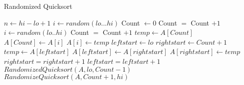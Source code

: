 \documentclass[11pt]{article}%
\begin{document}
    \begin{algorithm}
        \caption{Randomized Quicksort}
        \begin{algorithmic} 
        \newline
        \STATE $n \leftarrow hi - lo + 1$
        \STATE $i \leftarrow random (lo ... hi)$
        \STATE Count $\leftarrow 0$
        \STATE Count $=$ Count $+ 1$
        \ENDIF
        \ENDFOR
        \STATE $i \leftarrow random (lo .. hi) $
        \STATE Count $=$ Count $+ 1$
        \ENDIF
        \ENDFOR
        \ENDWHILE
        \STATE $temp \leftarrow A[Count]$
        \STATE $A[Count] \leftarrow A[i]$
        \STATE $A[i] \leftarrow temp$
        \STATE $leftstart \leftarrow lo$
        \STATE $rightstart \leftarrow Count+1$
        \STATE $temp \leftarrow A[leftstart]$
        \STATE $A[leftstart] \leftarrow A[rightstart]$
        \STATE $A[rightstart] \leftarrow temp$
        \STATE $rightstart = rightstart + 1$
        \ELSE $leftstart = leftstart + 1$ 
        \ENDIF
        \ENDWHILE
        \STATE $RandomizedQuicksort(A,lo,Count-1)$
        \STATE $RandomizeQuicksort(A, Count+1, hi)$
        \end{algorithmic}
        \end{algorithm}
\end{document}
